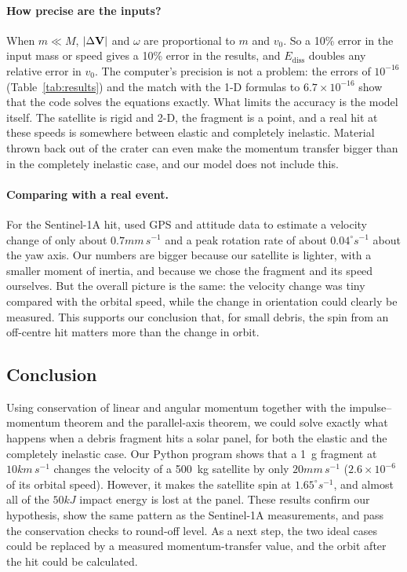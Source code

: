 \paragraph{How precise are the inputs?}
When $m\ll M$, $|\Delta\mathbf{V}|$ and $\omega$ are proportional to $m$ and
$v_0$. So a 10\% error in the input mass or speed gives a 10\% error in
the results, and $E_{\mathrm{diss}}$ doubles any relative error in $v_0$.
The computer's precision is not a problem: the errors of $10^{-16}$
(Table~\ref{tab:results}) and the match with the 1-D formulas to
$6.7\times10^{-16}$ show that the code solves the equations exactly. What
limits the accuracy is the model itself. The satellite is rigid and 2-D,
the fragment is a point, and a real hit at these speeds is somewhere
between elastic and completely inelastic. Material thrown back out of the
crater can even make the momentum transfer bigger than in the completely
inelastic case, and our model does not include this.

\paragraph{Comparing with a real event.}
For the Sentinel-1A hit, \citet{krag2017} used GPS and attitude data to
estimate a velocity change of only about $0.7\unit{mm\,s^{-1}}$ and a
peak rotation rate of about $0.04^\circ\unit{s^{-1}}$ about the yaw axis.
Our numbers are bigger because our satellite is lighter, with a smaller
moment of inertia, and because we chose the fragment and its speed
ourselves. But the overall picture is the same: the velocity change was
tiny compared with the orbital speed, while the change in orientation
could clearly be measured. This supports our conclusion that, for small
debris, the spin from an off-centre hit matters more than the change in
orbit.



\subsection{Conclusion}

Using conservation of linear and angular momentum together with the
impulse--momentum theorem and the parallel-axis theorem, we could solve
exactly what happens when a debris fragment hits a solar panel, for both
the elastic and the completely inelastic case. Our Python program shows
that a 1~g fragment at $10\unit{km\,s^{-1}}$ changes the velocity of a
500~kg satellite by only $20\unit{mm\,s^{-1}}$ ($2.6\times10^{-6}$ of its
orbital speed). However, it makes the satellite spin at
$1.65^\circ\unit{s^{-1}}$, and almost all of the $50\unit{kJ}$ impact
energy is lost at the panel. These results confirm our hypothesis, show
the same pattern as the Sentinel-1A measurements, and pass the
conservation checks to round-off level. As a next step, the two ideal
cases could be replaced by a measured momentum-transfer value, and the
orbit after the hit could be calculated.
